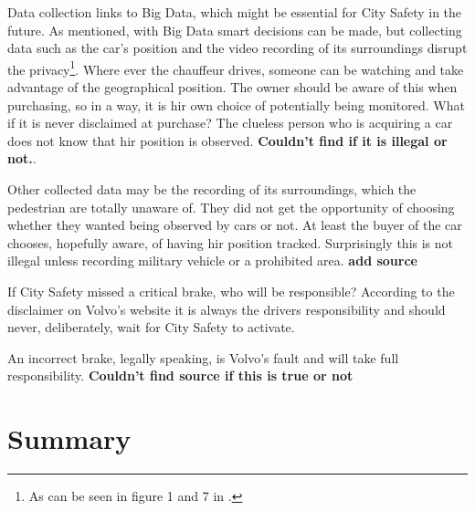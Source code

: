 \documentclass[conference]{IEEEtran}
\begin{document}
Data collection links to Big Data, which might be essential for City Safety in the future. As mentioned, with Big Data smart decisions can be made, but collecting data such as the car's position and the video recording of its surroundings disrupt the privacy\footnote{As can be seen in figure 1 and 7 in \cite{SysDescription}.}.  Where ever the chauffeur drives, someone can be watching and take advantage of the geographical position. The owner should be aware of this when purchasing, so in a way, it is hir own choice of potentially being monitored. What if it is never disclaimed at purchase? The clueless person who is acquiring a car does not know that hir position is observed. \textbf{Couldn't find if it is illegal or not.}.

Other collected data may be the recording of its surroundings, which the pedestrian are totally unaware of. They did not get the opportunity of choosing whether they wanted being observed by cars or not. At least the buyer of the car chooses, hopefully aware, of having hir position tracked. Surprisingly this is not illegal unless recording military vehicle or a prohibited area. \textbf{add source}

If City Safety missed a critical brake, who will be responsible? According to the disclaimer on Volvo's website it is always the drivers responsibility and should never, deliberately, wait for City Safety to activate. \cite{CitySafetyLegal}

An incorrect brake, legally speaking, is Volvo's fault and will take full responsibility. \textbf{Couldn't find source if this is true or not}


\section{Summary}

\end{document}
